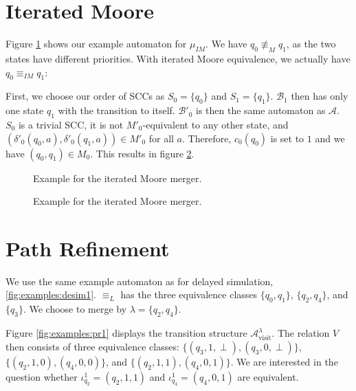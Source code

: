 \section{Iterated Moore}
Figure \ref{fig:examples:im1} shows our example automaton for $\mu_{IM}$. We have $q_0 \not\equiv_M q_1$, as the two states have different priorities. With iterated Moore equivalence, we actually have $q_0 \equiv_{IM} q_1$:

First, we choose our order of SCCs as $S_0 = \{q_0\}$ and $S_1 = \{q_1\}$. $\mathcal{B}_1$ then has only one state $q_1$ with the transition to itself. $\mathcal{B}'_0$ is then the same automaton as $\mathcal{A}$. $S_0$ is a trivial SCC, it is not $M'_0$-equivalent to any other state, and $(\delta'_0(q_0, a), \delta'_0(q_1, a)) \in M'_0$ for all $a$. Therefore, $c_0(q_0)$ is set to $1$ and we have $(q_0, q_1) \in M_0$. This results in figure \ref{fig:examples:im2}.

\begin{figure}
\centering
{}
\caption{Example for the iterated Moore merger.}
\label{fig:examples:im1}
\end{figure}


\begin{figure}
\centering
{}
\caption{Example for the iterated Moore merger.}
\label{fig:examples:im2}
\end{figure}


\section{Path Refinement}
We use the same example automaton as for delayed simulation, \ref{fig:examples:desim1}. $\equiv_L$ has the three equivalence classes $\{q_0, q_1\}$, $\{q_2, q_4\}$, and $\{q_3\}$. We choose to merge by $\lambda = \{q_2, q_4\}$.

Figure \ref{fig:examples:pr1} displays the transition structure $\mathcal{A}^\lambda_\text{visit}$. The relation $V$ then consists of three equivalence classes: $\{(q_3, 1, \perp), (q_3, 0, \perp)\}$, $\{(q_2, 1, 0), (q_4, 0, 0)\}$, and $\{(q_2, 1, 1), (q_4, 0, 1)\}$. We are interested in the question whether $\iota_{q_2}^1 = (q_2, 1, 1)$ and $\iota_{q_4}^1 = (q_4, 0, 1)$ are equivalent.


